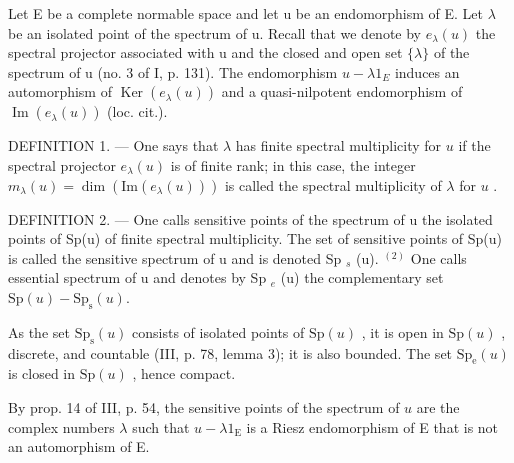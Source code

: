 Let E be a complete normable space and let u be an endomorphism of E. Let \(\lambda\) be an isolated point of the spectrum of u. Recall that we denote by \(e_{\lambda}(u)\) the spectral projector associated with u and the closed and open set \(\{\lambda\}\) of the spectrum of u (no. 3 of I, p. 131). The endomorphism \(u - \lambda1_{E}\) induces an automorphism of \(\operatorname{Ker}(e_{\lambda}(u))\) and a quasi-nilpotent endomorphism of \(\operatorname{Im}(e_{\lambda}(u))\) (loc. cit.).

DEFINITION 1. --- One says that \(\lambda\) has finite spectral multiplicity for \(u\) if the spectral projector \(e_{\lambda}(u)\) is of finite rank; in this case, the integer \(m_{\lambda}(u) = \dim (\mathrm{Im}(e_{\lambda}(u)))\) is called the spectral multiplicity of \(\lambda\) for \(u\) .

DEFINITION 2. --- One calls sensitive points of the spectrum of u the isolated points of Sp(u) of finite spectral multiplicity. The set of sensitive points of Sp(u) is called the sensitive spectrum of u and is denoted Sp \(_{s}\) (u). \(^{(2)}\) One calls essential spectrum of u and denotes by Sp \(_{e}\) (u) the complementary set \(\mathrm{Sp}(u) - \mathrm{Sp}_{\mathrm{s}}(u)\).

As the set \(\mathrm{Sp}_{\mathrm{s}}(u)\) consists of isolated points of \(\mathrm{Sp}(u)\) , it is open in \(\mathrm{Sp}(u)\) , discrete, and countable (III, p. 78, lemma 3); it is also bounded. The set \(\mathrm{Sp}_{\mathrm{e}}(u)\) is closed in \(\mathrm{Sp}(u)\) , hence compact.

By prop. 14 of III, p. 54, the sensitive points of the spectrum of \(u\) are the complex numbers \(\lambda\) such that \(u - \lambda 1_{\mathrm{E}}\) is a Riesz endomorphism of E that is not an automorphism of E.

